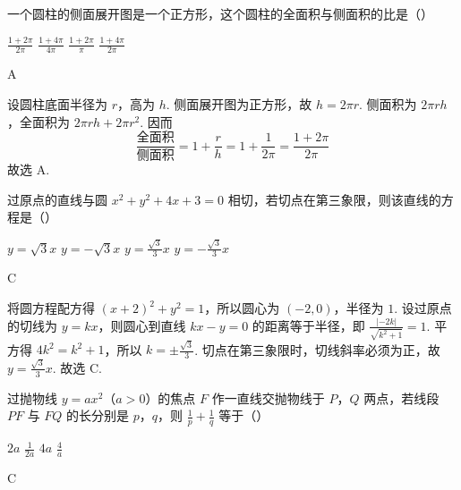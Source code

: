 \begin{problem}
一个圆柱的侧面展开图是一个正方形，这个圆柱的全面积与侧面积的比是（\quad）

\choices
    {\(\frac{1 + 2\pi}{2\pi}\)}
    {\(\frac{1 + 4\pi}{4\pi}\)}
    {\(\frac{1 + 2\pi}{\pi}\)}
    {\(\frac{1 + 4\pi}{2\pi}\)}
\end{problem}

\begin{answer}
A
\end{answer}

\begin{solution}
设圆柱底面半径为 \(r\)，高为 \(h\). 侧面展开图为正方形，故 \(h=2\pi r\). 侧面积为 \(2\pi rh\)，全面积为 \(2\pi rh+2\pi r^{2}\). 因而
\[
\frac{\text{全面积}}{\text{侧面积}}
=1+\frac{r}{h}
=1+\frac{1}{2\pi}
=\frac{1+2\pi}{2\pi}
\]
故选 A.
\end{solution}

\begin{problem}
过原点的直线与圆 \(x^{2} + y^{2} + 4x + 3 = 0\) 相切，若切点在第三象限，则该直线的方程是（\quad）

\choices
    {\(y = \sqrt{3}x\)}
    {\(y = -\sqrt{3}x\)}
    {\(y = \frac{\sqrt{3}}{3}x\)}
    {\(y = -\frac{\sqrt{3}}{3}x\)}
\end{problem}

\begin{answer}
C
\end{answer}

\begin{solution}
将圆方程配方得 \((x+2)^{2}+y^{2}=1\)，所以圆心为 \((-2,0)\)，半径为 \(1\). 设过原点的切线为 \(y=kx\)，则圆心到直线 \(kx-y=0\) 的距离等于半径，即 \(\frac{|{-2k}|}{\sqrt{k^{2}+1}}=1\). 平方得 \(4k^{2}=k^{2}+1\)，所以 \(k=\pm\frac{\sqrt{3}}{3}\). 切点在第三象限时，切线斜率必须为正，故 \(y=\frac{\sqrt{3}}{3}x\).
故选 C.
\end{solution}

\begin{problem}
过抛物线 \(y = ax^{2}\)（\(a > 0\)）的焦点 \(F\) 作一直线交抛物线于 \(P\)，\(Q\) 两点，若线段 \(PF\) 与 \(FQ\) 的长分别是 \(p\)，\(q\)，则 \(\frac{1}{p} + \frac{1}{q}\) 等于（\quad）

\choices
    {\(2a\)}
    {\(\frac{1}{2a}\)}
    {\(4a\)}
    {\(\frac{4}{a}\)}
\end{problem}

\begin{answer}
C
\end{answer}

